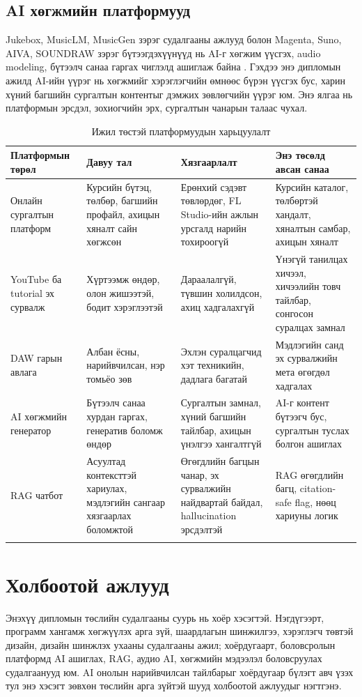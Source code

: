 \subsection{AI хөгжмийн платформууд}
Jukebox, MusicLM, MusicGen зэрэг судалгааны ажлууд болон Magenta, Suno, AIVA, SOUNDRAW зэрэг бүтээгдэхүүнүүд нь AI-г хөгжим үүсгэх, audio modeling, бүтээлч санаа гаргах чиглэлд ашиглаж байна \cite{jukebox_dhariwal_2020,musiclm_2023,musicgen_2023,magenta_site,suno_ai_app,aiva_ai,soundraw_home}. Гэхдээ энэ дипломын ажилд AI-ийн үүрэг нь хөгжмийг хэрэглэгчийн өмнөөс бүрэн үүсгэх бус, харин хүний багшийн сургалтын контентыг дэмжих зөвлөгчийн үүрэг юм. Энэ ялгаа нь платформын эрсдэл, зохиогчийн эрх, сургалтын чанарын талаас чухал.

\begin{longtable}{|p{}|p{}|p{}|p{}|}
  \hline
  \textbf{Платформын төрөл} & \textbf{Давуу тал} & \textbf{Хязгаарлалт} & \textbf{Энэ төсөлд авсан санаа} \\ \hline
  Онлайн сургалтын платформ & Курсийн бүтэц, төлбөр, багшийн профайл, ахицын хяналт сайн хөгжсөн & Ерөнхий сэдэвт төвлөрдөг, FL Studio-ийн ажлын урсгалд нарийн тохироогүй & Курсийн каталог, төлбөртэй хандалт, хяналтын самбар, ахицын хяналт \\ \hline
  YouTube ба tutorial эх сурвалж & Хүртээмж өндөр, олон жишээтэй, бодит хэрэглээтэй & Дараалалгүй, түвшин холилдсон, ахиц хадгалахгүй & Үнэгүй танилцах хичээл, хичээлийн товч тайлбар, сонгосон суралцах замнал \\ \hline
  DAW гарын авлага & Албан ёсны, нарийвчилсан, нэр томьёо зөв & Эхлэн суралцагчид хэт техникийн, дадлага багатай & Мэдлэгийн санд эх сурвалжийн мета өгөгдөл хадгалах \\ \hline
  AI хөгжмийн генератор & Бүтээлч санаа хурдан гаргах, генератив боломж өндөр & Сургалтын замнал, хүний багшийн тайлбар, ахицын үнэлгээ хангалтгүй & AI-г контент бүтээгч бус, сургалтын туслах болгон ашиглах \\ \hline
  RAG чатбот & Асуултад контексттэй хариулах, мэдлэгийн сангаар хязгаарлах боломжтой & Өгөгдлийн багцын чанар, эх сурвалжийн найдвартай байдал, hallucination эрсдэлтэй & RAG өгөгдлийн багц, citation-safe flag, нөөц хариуны логик \\ \hline
  \caption{Ижил төстэй платформуудын харьцуулалт}
  \label{tab:related-platforms}
\end{longtable}

\section{Холбоотой ажлууд}
Энэхүү дипломын төслийн судалгааны суурь нь хоёр хэсэгтэй. Нэгдүгээрт, программ хангамж хөгжүүлэх арга зүй, шаардлагын шинжилгээ, хэрэглэгч төвтэй дизайн, дизайн шинжлэх ухааны судалгааны ажил; хоёрдугаарт, боловсролын платформд AI ашиглах, RAG, аудио AI, хөгжмийн мэдээлэл боловсруулах судалгаанууд юм. AI онолын нарийвчилсан тайлбарыг хоёрдугаар бүлэгт авч үзэх тул энэ хэсэгт зөвхөн төслийн арга зүйтэй шууд холбоотой ажлуудыг нэгтгэнэ.

